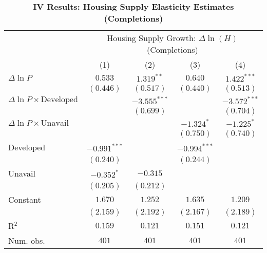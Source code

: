 
\begin{table}[H]
\caption{\textbf{IV Results: Housing Supply Elasticity Estimates (Completions)}}
\begin{center}
\begin{normalsize}
\begin{threeparttable}
\begin{tabular}{l@{} c@{} c@{} c@{} c@{}}
\toprule
 & \multicolumn{4}{c}{Housing Supply Growth: $\Delta\ln(H)$ (Completions)} \\
\cmidrule(lr){2-5}
 & (1) & (2) & (3) & (4) \\
\midrule
$\Delta\ln P$                         & $0.533$        & $1.319^{**}$   & $0.640$        & $1.422^{***}$  \\
                                      & $(0.446)$      & $(0.517)$      & $(0.440)$      & $(0.513)$      \\
$\Delta\ln P\times{\text{Developed}}$ &                & $-3.555^{***}$ &                & $-3.572^{***}$ \\
                                      &                & $(0.699)$      &                & $(0.704)$      \\
$\Delta\ln P\times{\text{Unavail}}$   &                &                & $-1.324^{*}$   & $-1.225^{*}$   \\
                                      &                &                & $(0.750)$      & $(0.740)$      \\
Developed                             & $-0.991^{***}$ &                & $-0.994^{***}$ &                \\
                                      & $(0.240)$      &                & $(0.244)$      &                \\
Unavail                               & $-0.352^{*}$   & $-0.315$       &                &                \\
                                      & $(0.205)$      & $(0.212)$      &                &                \\
Constant                              & $1.670$        & $1.252$        & $1.635$        & $1.209$        \\
                                      & $(2.159)$      & $(2.192)$      & $(2.167)$      & $(2.189)$      \\
\midrule
R$^2$                                 & $0.159$        & $0.121$        & $0.151$        & $0.121$        \\
Num. obs.                             & $401$          & $401$          & $401$          & $401$          \\

\end{tabular}
\end{threeparttable}
\end{normalsize}
\end{center}
\end{table}

